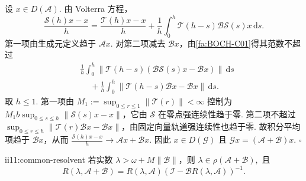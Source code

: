 \begin{FAProof}
设 \(\displaystyle x\in D(\mathcal A)\). 由 Volterra 方程，
\[
\frac{\mathcal S(h)x-x}{h}
=
\frac{\mathcal T(h)x-x}{h}
+
\frac1h
\int_0^h
\mathcal T(h-s)\mathcal B\mathcal S(s)x
\,\mathrm{d}s.
\]
第一项由生成元定义趋于 \(\displaystyle\mathcal Ax\). 对第二项减去 \(\displaystyle\mathcal Bx\)，由\autoref{fa:BOCH-C01}得其范数不超过
\[
\begin{aligned}
&\displaystyle \frac1h\int_0^h
\|\mathcal T(h-s)(\mathcal B\mathcal S(s)x-\mathcal Bx)\|
\,\mathrm{d}s\\[12pt]
&\displaystyle \mathrel{\phantom{+}}+
\frac1h\int_0^h
\|\mathcal T(h-s)\mathcal Bx-\mathcal Bx\|
\,\mathrm{d}s.
\end{aligned}
\]
取 \(\displaystyle h\leqslant1\). 第一项由 \(\displaystyle M_1:=\sup_{0\leqslant r\leqslant1}\|\mathcal T(r)\|<\infty\) 控制为 \(\displaystyle M_1b\sup_{0\leqslant s\leqslant h}\|\mathcal S(s)x-x\|\)，它由 \(\displaystyle\mathcal S\) 在零点强连续性趋于零. 第二项不超过 \(\displaystyle \sup_{0\leqslant r\leqslant h}\|\mathcal T(r)\mathcal Bx-\mathcal Bx\|\)，由固定向量轨道强连续性也趋于零. 故积分平均项趋于 \(\displaystyle\mathcal Bx\)，从而 \(\displaystyle \frac{\mathcal S(h)x-x}{h} \longrightarrow \mathcal Ax+\mathcal Bx.\)
因此 \(\displaystyle x\in D(\mathcal G)\) 且 \(\displaystyle\mathcal Gx=(\mathcal A+\mathcal B)x\).
\hfill\(\square\)
\end{FAProof}

\begin{FAProposition}{ii11:common-resolvent}
若实数 \(\displaystyle\lambda>\omega+M\|\mathcal B\|\)，则 \(\displaystyle \lambda\in\rho(\mathcal A+\mathcal B),\)
且
\[
R(\lambda,\mathcal A+\mathcal B)
=
R(\lambda,\mathcal A)
\left(
\mathcal I-\mathcal BR(\lambda,\mathcal A)
\right)^{-1}.
\]
\end{FAProposition}

